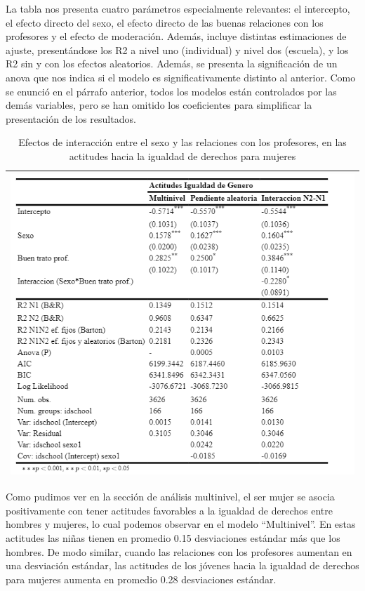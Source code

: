 \documentclass[12pt,twoside]{templates/facsothesis}
\begin{document}
La tabla nos presenta cuatro parámetros especialmente relevantes: el intercepto, el efecto directo del sexo, el efecto directo de las buenas relaciones con los profesores y el efecto de moderación. Además, incluye distintas estimaciones de ajuste, presentándose los R2 a nivel uno (individual) y nivel dos (escuela), y los R2 sin y con los efectos aleatorios. Además, se presenta la significación de un anova que nos indica si el modelo es significativamente distinto al anterior. Como se enunció en el párrafo anterior, todos los modelos están controlados por las demás variables, pero se han omitido los coeficientes para simplificar la presentación de los resultados.

\begin{longtable}[]{@{}l@{}}
\caption{\label{tab:unnamed-chunk-11}Efectos de interacción entre el sexo y las relaciones con los profesores, en las actitudes hacia la igualdad de derechos para mujeres}\tabularnewline
\toprule
\endhead
\includegraphics[width=\textwidth,height=0.8\textheight]{input/images/INTERACCION1.png} \\
\bottomrule
\end{longtable}

Como pudimos ver en la sección de análisis multinivel, el ser mujer se asocia positivamente con tener actitudes favorables a la igualdad de derechos entre hombres y mujeres, lo cual podemos observar en el modelo ``Multinivel''. En estas actitudes las niñas tienen en promedio 0.15 desviaciones estándar más que los hombres. De modo similar, cuando las relaciones con los profesores aumentan en una desviación estándar, las actitudes de los jóvenes hacia la igualdad de derechos para mujeres aumenta en promedio 0.28 desviaciones estándar.
\end{document}
